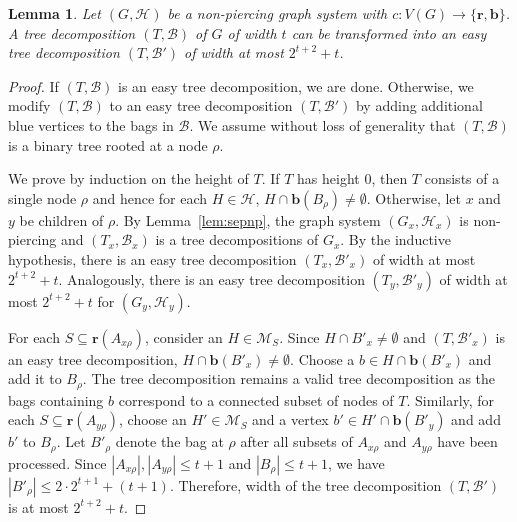 \documentclass[12pt]{article}
\newcommand{\BB}{\mathcal{B}}
\newcommand{\R}{\mathbf{r}}
\newcommand{\B}{\mathbf{b}}
\newtheorem{lemma}[theorem]{Lemma}
\theoremstyle{case}
\begin{document}
\begin{lemma}
\label{lem:makeeasy}
Let $(G,\mathcal{H})$ be a non-piercing graph system with 
$c:V(G)\to\{\R,\B\}$. A tree decomposition $(T,\mathcal{B})$ of 
$G$ of width $t$ can be transformed into an easy tree decomposition
$(T,\mathcal{B}')$ of width at most $2^{t+2} + t$.
\end{lemma}
\begin{proof}
If $(T,\mathcal{B})$ is an easy tree decomposition, we are done. 
Otherwise, we modify $(T,\mathcal{B})$ to an easy tree decomposition
$(T,\mathcal{B}')$ 
by adding additional blue vertices to the bags in $\mathcal{B}$.
We assume without loss of generality that $(T,\mathcal{B})$ is a
binary tree rooted at a node $\rho$.

We prove by induction on the height of $T$. If $T$ has height 0,
then $T$ consists of a single node $\rho$ 
and hence for each $H\in\mathcal{H}$, $H\cap\B(B_\rho)\neq\emptyset$.
Otherwise, let $x$ and $y$ be children
of $\rho$. By Lemma~\ref{lem:sepnp}, the graph system
$(G_x,\mathcal{H}_x)$ is non-piercing
and $(T_x,\mathcal{B}_x)$ is a tree decompositions of $G_x$. By the
inductive hypothesis, there is an easy tree decomposition
$(T_x,\mathcal{B}'_x)$ of
width at most $2^{t+2}+t$. 
Analogously, there is an easy tree decomposition $(T_y,\mathcal{B}'_y)$
of width at most $2^{t+2}+t$ for $(G_y,\mathcal{H}_y)$.

For each $S\subseteq \R(A_{x\rho})$, consider an $H\in\mathcal{M}_S$. Since $H\cap B'_x\neq\emptyset$ and
$(T,\mathcal{B}'_x)$ is an easy tree decomposition, $H\cap \B(B'_x)\neq\emptyset$. Choose a $b\in H\cap\B(B'_x)$ and add it
to $B_\rho$. The tree decomposition remains a valid tree decomposition
as the bags containing $b$ correspond to a connected
subset of nodes of $T$.
Similarly, for each $S\subseteq \R(A_{y\rho})$,
choose an $H'\in \mathcal{M}_S$ and a vertex
$b'\in H'\cap\B(B'_y)$ and add $b'$ to $B_\rho$. 
Let $B'_\rho$ denote the
bag at $\rho$ after all subsets of $A_{x\rho}$ and $A_{y\rho}$
have been processed. 
Since $|A_{x\rho}|,|A_{y\rho}|\le t+1$ and $|B_{\rho}|\le t+1$, we have $|B'_\rho|\le 2\cdot 2^{t+1}+(t+1)$.
Therefore, width of the tree decomposition $(T,\BB')$ is at most $2^{t+2}+t$.


\end{proof}
\end{document}
